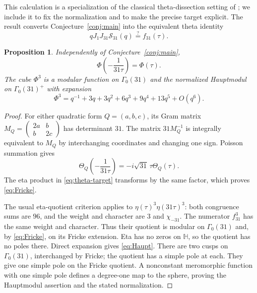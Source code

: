\documentclass[11pt,reqno]{amsart}
\newcommand{\HH}{\mathbb H}
\newcommand{\Ssum}{\mathcal S_{31}}
\newtheorem{proposition}[theorem]{Proposition}
\theoremstyle{remark}
\numberwithin{equation}{section}
\begin{document}
This calculation is a specialization of the classical theta-dissection
setting of \cite{BY}; we include it to fix the normalization and to
make the precise target explicit. The result converts
Conjecture~\ref{conj:main} into the equivalent theta identity
\begin{equation}\label{eq:theta-conjecture}
 qJ_1J_{31}\Ssum(q)\stackrel?=f_{31}(\tau).
\end{equation}

\begin{proposition}\label{prop:Fricke}
Independently of Conjecture~\ref{conj:main},
\begin{equation}\label{eq:Fricke}
 \Phi\left(-\frac1{31\tau}\right)=\Phi(\tau).
\end{equation}
The cube $\Phi^3$ is a modular function on $\Gamma_0(31)$ and the
normalized Hauptmodul on $\Gamma_0(31)^+$ with expansion
\begin{equation}\label{eq:Haupt}
 \Phi^3=q^{-1}+3q+3q^2+6q^3+9q^4+13q^5+O(q^6).
\end{equation}
\end{proposition}
\begin{proof}
For either quadratic form $Q=(a,b,c)$, its Gram matrix
$M_Q=\left(\begin{smallmatrix}2a&b\\b&2c\end{smallmatrix}\right)$ has
determinant $31$. The matrix $31M_Q^{-1}$ is integrally equivalent to
$M_Q$ by interchanging coordinates and changing one sign.
Poisson summation gives
\[
 \Theta_Q\left(-\frac1{31\tau}\right)
 =-i\sqrt{31}\,\tau\Theta_Q(\tau).
\]
The eta product in \eqref{eq:theta-target} transforms by the same factor,
which proves \eqref{eq:Fricke}.

The usual eta-quotient criterion applies to
$\eta(\tau)^3\eta(31\tau)^3$: both congruence sums are $96$, and the
weight and character are $3$ and $\chi_{-31}$. The numerator $f_{31}^3$
has the same weight and character. Thus their quotient is modular on
$\Gamma_0(31)$ and, by \eqref{eq:Fricke}, on its Fricke extension.
Eta has no zeros on $\HH$, so the quotient has no poles there.
Direct expansion gives \eqref{eq:Haupt}. There are two cusps on
$\Gamma_0(31)$, interchanged by Fricke; the quotient has a simple pole
at each. They give one simple pole on the Fricke quotient. A nonconstant
meromorphic function with one simple pole defines a degree-one map to
the sphere, proving the Hauptmodul assertion and the stated normalization.
\end{proof}
\end{document}
